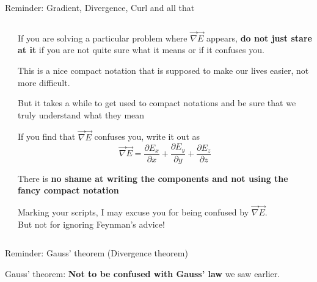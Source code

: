 {\begin{frame}{Reminder: Gradient, Divergence, Curl and all that}
\begin{columns}
\begin{column}{0.25\textwidth}
\begin{center}
   \end{center}
  \end{column}
  \begin{column}{0.75\textwidth}
    \begin{itemize}
    {\scriptsize
      \item If you are solving a particular problem where $\vec{\nabla} \vec{E}$ appears,
            {\bf do not just stare at it} if you are not quite sure what it means or if it confuses you.
      \item This is a nice compact notation that is supposed to make our lives easier,
            not more difficult.
      \item But it takes a while to get used to compact notations and be sure that we truly understand what they mean
      \item If you find that $\vec{\nabla} \vec{E}$ confuses you, write it out as
        \begin{equation*}
         \vec{\nabla} \vec{E} = \frac{\partial E_{x}}{\partial x} + \frac{\partial E_{y}}{\partial y} + \frac{\partial E_{z}}{\partial z}
        \end{equation*}
      \item There is {\bf no shame at writing the components and not using the fancy compact notation}
    }
    \end{itemize}

    \begin{center}
    {\scriptsize
     Marking your scripts, I may excuse you for being confused by $\vec{\nabla} \vec{E}$.\\
     But not for ignoring Feynman's advice!
    }
    \end{center}

  \end{column}
\end{columns}

\end{frame}


%
%
%

\begin{frame}{Reminder: Gauss' theorem (Divergence theorem)}

\begin{center}
  Gauss' theorem: {\bf Not to be confused with Gauss' law} we saw earlier.
\end{center}


\end{frame}}
